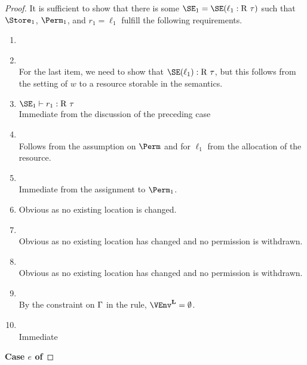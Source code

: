\begin{proof}
  It is sufficient to show that there is some $\SE_1 = \SE(\ell_1 :
  \tapp\tres\tau)$ such that  
  $\Store_1$, $\Perm_1$, and $r_1 = \ell_1$ fulfill the following requirements.
  \begin{enumerate}[({R}1)]
  \item {}
  \item {} \\
    For the last item, we need to show that $\SE (\ell_1) :
    \tapp\tres\tau$, but this follows from the setting of $w$ to a
    resource storable in the semantics.
  \item $\SE_1 \vdash r_1 : \tapp\tres\tau$ \\
    Immediate from the discussion of the preceding case
  \item {} \\
    Follows from the assumption on $\Perm$ and for $\ell_1$ from the
    allocation of the resource.
  \item {} \\
    Immediate from the assignment to $\Perm_1$.
  \item {} 
    Obvious as no existing location is changed.
  \item {} \\
    Obvious as no existing location has changed and no permission is withdrawn.
  \item {} \\
    Obvious as no existing location has changed and no permission is
    withdrawn.
  \item {} \\
    By the constraint on $\Gamma$ in the  rule, $\Active\VEnv = \emptyset$.
  \item {} \\
    Immediate
  \end{enumerate}
  
  \newpage
  \textbf{Case $e$ of}


\end{proof}
